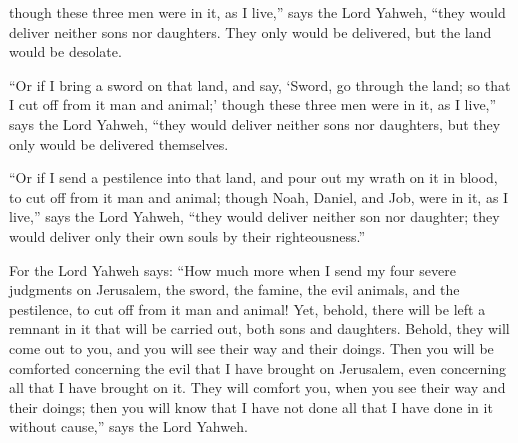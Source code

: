 {though these three men were in it, as I live,” says the Lord Yahweh, “they would deliver neither sons nor daughters. They only would be delivered, but the land would be desolate.
\par }{\PP {}“Or if I bring a sword on that land, and say, ‘Sword, go through the land; so that I cut off from it man and animal;’
though these three men were in it, as I live,” says the Lord Yahweh, “they would deliver neither sons nor daughters, but they only would be delivered themselves.
\par }{\PP {}“Or if I send a pestilence into that land, and pour out my wrath on it in blood, to cut off from it man and animal;
though Noah, Daniel, and Job, were in it, as I live,” says the Lord Yahweh, “they would deliver neither son nor daughter; they would deliver only their own souls by their righteousness.”
\par }{\PP {}For the Lord Yahweh says: “How much more when I send my four severe judgments on Jerusalem, the sword, the famine, the evil animals, and the pestilence, to cut off from it man and animal!
Yet, behold, there will be left a remnant in it that will be carried out, both sons and daughters. Behold, they will come out to you, and you will see their way and their doings. Then you will be comforted concerning the evil that I have brought on Jerusalem, even concerning all that I have brought on it.
They will comfort you, when you see their way and their doings; then you will know that I have not done all that I have done in it without cause,” says the Lord Yahweh.

\par }
